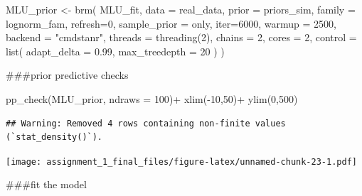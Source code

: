 \documentclass[
]{article}
\newenvironment{Shaded}{\begin{snugshade}}{\end{snugshade}}
\newcommand{\AttributeTok}[1]{\textcolor[rgb]{0.77,0.63,0.00}{#1}}
\newcommand{\DecValTok}[1]{\textcolor[rgb]{0.00,0.00,0.81}{#1}}
\newcommand{\FloatTok}[1]{\textcolor[rgb]{0.00,0.00,0.81}{#1}}
\newcommand{\FunctionTok}[1]{\textcolor[rgb]{0.00,0.00,0.00}{#1}}
\newcommand{\NormalTok}[1]{#1}
\newcommand{\OtherTok}[1]{\textcolor[rgb]{0.56,0.35,0.01}{#1}}
\newcommand{\SpecialCharTok}[1]{\textcolor[rgb]{0.00,0.00,0.00}{#1}}
\newcommand{\StringTok}[1]{\textcolor[rgb]{0.31,0.60,0.02}{#1}}
\begin{document}
\begin{Shaded}
\begin{Highlighting}[]
\NormalTok{MLU\_prior }\OtherTok{\textless{}{-}} \FunctionTok{brm}\NormalTok{(}
\NormalTok{  MLU\_fit, }
  \AttributeTok{data =}\NormalTok{ real\_data, }
  \AttributeTok{prior =}\NormalTok{ priors\_sim,}
  \AttributeTok{family =}\NormalTok{ lognorm\_fam,}
  \AttributeTok{refresh=}\DecValTok{0}\NormalTok{,}
  \AttributeTok{sample\_prior =} \StringTok{\textquotesingle{}only\textquotesingle{}}\NormalTok{,}
  \AttributeTok{iter=}\DecValTok{6000}\NormalTok{,}
  \AttributeTok{warmup =} \DecValTok{2500}\NormalTok{,}
  \AttributeTok{backend =} \StringTok{"cmdstanr"}\NormalTok{,}
  \AttributeTok{threads =} \FunctionTok{threading}\NormalTok{(}\DecValTok{2}\NormalTok{),}
  \AttributeTok{chains =} \DecValTok{2}\NormalTok{,}
  \AttributeTok{cores =} \DecValTok{2}\NormalTok{,}
  \AttributeTok{control =} \FunctionTok{list}\NormalTok{(}
    \AttributeTok{adapt\_delta =} \FloatTok{0.99}\NormalTok{,}
    \AttributeTok{max\_treedepth =} \DecValTok{20}
\NormalTok{)}
\NormalTok{)}
\end{Highlighting}
\end{Shaded}

\#\#\#prior predictive checks

\begin{Shaded}
\begin{Highlighting}[]
\FunctionTok{pp\_check}\NormalTok{(MLU\_prior, }\AttributeTok{ndraws =} \DecValTok{100}\NormalTok{)}\SpecialCharTok{+}
  \FunctionTok{xlim}\NormalTok{(}\SpecialCharTok{{-}}\DecValTok{10}\NormalTok{,}\DecValTok{50}\NormalTok{)}\SpecialCharTok{+}
  \FunctionTok{ylim}\NormalTok{(}\DecValTok{0}\NormalTok{,}\DecValTok{500}\NormalTok{)}
\end{Highlighting}
\end{Shaded}

\begin{verbatim}
## Warning: Removed 4 rows containing non-finite values (`stat_density()`).
\end{verbatim}

\texttt{[image: assignment\_1\_final\_files/figure-latex/unnamed-chunk-23-1.pdf]}

\#\#\#fit the model
\end{document}

